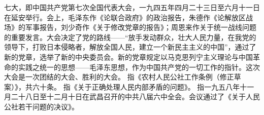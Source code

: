 \begin{maonote}
七大，即中国共产党第七次全国代表大会，一九四五年四月二十三日至六月十一日在延安举行。会上，毛泽东作《论联合政府》的政治报告，朱德作《论解放区战场》的军事报告，刘少奇作《关于修改党章的报告》；周恩来作关于统一战线问题的重要发言。大会决定了党的路线——“放手发动群众，壮大人民力量，在我党的领导下，打败日本侵略者，解放全国人民，建立一个新民主主义的中国”，通过了新的党章，选举了新的中央委员会。新的党章规定以马克思列宁主义理论与中国革命的实践之统一的思想——毛泽东思想，作为中国共产党的一切工作的指针。这次大会是一次团结的大会、胜利的大会。
指《农村人民公社工作条例（修正草案）》，共六十条。
指《关于正确处理人民内部矛盾的问题》。
指一九五八年十一月二十八日至十二月十日在武昌召开的中共八届六中全会。会议通过了《关于人民公社若干问题的决议》。
\end{maonote}

